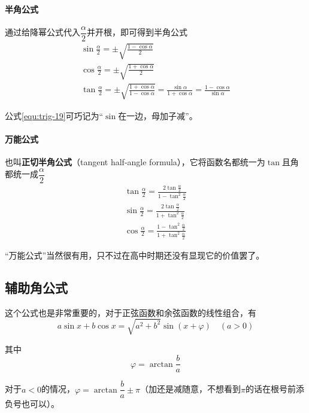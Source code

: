 \paragraph{半角公式}
通过给降幂公式代入$\dfrac{\alpha}{2}$并开根，即可得到半角公式
\begin{gather}
    \sin\frac{\alpha}{2}=\pm\sqrt{\frac{1-\cos\alpha}{2}} \label{equ:trig-17} \\
    \cos\frac{\alpha}{2}=\pm\sqrt{\frac{1+\cos\alpha}{2}} \label{equ:trig-18} \\
    \tan\frac{\alpha}{2}=\pm\sqrt{\frac{1+\cos\alpha}{1-\cos\alpha}}=\frac{\sin\alpha}{1+\cos\alpha}=\frac{1-\cos\alpha}{\sin\alpha} \label{equ:trig-19}
\end{gather}

公式\eqref{equ:trig-19}可巧记为“$\sin$在一边，母加子减”。

\paragraph{万能公式}
也叫\textbf{正切半角公式}（tangent half-angle formula），它将函数名都统一为$\tan$且角都统一成$\dfrac{\alpha}{2}$
\begin{gather}
    \tan\frac{\alpha}{2}=\frac{2\tan\frac{\alpha}{2}}{1-\tan^2\frac{\alpha}{2}} \label{equ:trig-20} \\
    \sin\frac{\alpha}{2}=\frac{2\tan\frac{\alpha}{2}}{1+\tan^2\frac{\alpha}{2}} \label{equ:trig-21} \\
    \cos\frac{\alpha}{2}=\frac{1-\tan^2\frac{\alpha}{2}}{1+\tan^2\frac{\alpha}{2}} \label{equ:trig-22}
\end{gather}

“万能公式”当然很有用，只不过在高中时期还没有显现它的价值罢了。


\subsection{辅助角公式}
这个公式也是非常重要的，对于正弦函数和余弦函数的线性组合，有\[a\sin x+b\cos x=\sqrt{a^2+b^2}\sin(x+\varphi)\quad(a>0)\]

其中\[\varphi=\arctan\frac{b}{a}\]

对于$a<0$的情况，$\varphi=\arctan\dfrac{b}{a}\pm\pi$（加还是减随意，不想看到$\pi$的话在根号前添负号也可以）。

